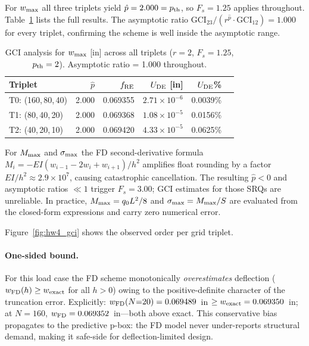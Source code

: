 \documentclass[10pt,twocolumn]{article}
\begin{document}
For $w_{\rm max}$ all three triplets yield $\hat{p}=2.000=p_{\rm th}$,
so $F_s=1.25$ applies throughout.
Table~\ref{tab:gci_all} lists the full results.
The asymptotic ratio $\mathrm{GCI}_{23}/(r^{\hat{p}}\cdot\mathrm{GCI}_{12})=1.000$
for every triplet, confirming the scheme is well inside the asymptotic range.

\begin{table}[ht]
\centering
\caption{GCI analysis for $w_{\rm max}$ [in] across all triplets
  ($r=2$, $F_s=1.25$, $p_{\rm th}=2$). Asymptotic ratio = 1.000 throughout.}
\label{tab:gci_all}
\footnotesize
\setlength{\tabcolsep}{3pt}
\begin{tabular}{@{}lrrrrr@{}}
\toprule
Triplet & $\hat{p}$ & $f_{\rm RE}$ & $U_{\rm DE}$ [in] & $U_{\rm DE}$\% \\
\midrule
T0: (160,\,80,\,40) & 2.000 & 0.069355 & $2.71\times10^{-6}$ & 0.0039\%\\
T1: (80,\,40,\,20)  & 2.000 & 0.069368 & $1.08\times10^{-5}$ & 0.0156\%\\
T2: (40,\,20,\,10)  & 2.000 & 0.069420 & $4.33\times10^{-5}$ & 0.0625\%\\
\bottomrule
\end{tabular}
\end{table}

For $M_{\rm max}$ and $\sigma_{\rm max}$ the FD second-derivative formula
$M_i=-EI(w_{i-1}-2w_i+w_{i+1})/h^2$ amplifies float rounding by a factor
$EI/h^2\approx2.9\times10^7$, causing catastrophic cancellation.
The resulting $\hat{p}<0$ and asymptotic ratios $\ll1$ trigger $F_s=3.00$;
GCI estimates for those SRQs are unreliable.
In practice, $M_{\rm max}=q_0L^2/8$ and $\sigma_{\rm max}=M_{\rm max}/S$
are evaluated from the closed-form expressions and carry zero numerical error.

Figure~\ref{fig:hw4_gci} shows the observed order per grid triplet.

\paragraph{One-sided bound.}
For this load case the FD scheme monotonically \emph{overestimates}
deflection ($w_{\rm FD}(h)\ge w_{\rm exact}$ for all $h>0$) owing to
the positive-definite character of the truncation error.
Explicitly: $w_{\rm FD}(N{=}20)=0.069489$~in $\ge w_{\rm exact}=0.069350$~in;
at $N=160$, $w_{\rm FD}=0.069352$~in---both above exact.
This conservative bias propagates to the predictive p-box: the FD model
never under-reports structural demand, making it safe-side for
deflection-limited design.
\end{document}
